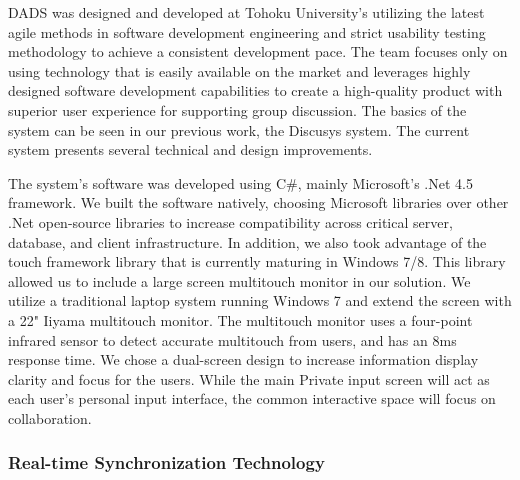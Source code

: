 \documentclass{sigchi}
\begin{document}
DADS was designed and developed at Tohoku University's  utilizing the latest agile methods in software development engineering and strict usability testing methodology to achieve a consistent development pace. The team focuses only on using technology that is easily available on the market and leverages highly designed software development capabilities to create a high-quality product with superior user experience for supporting group discussion. The basics of the system can be seen in our previous work, the Discusys system\cite{widjaja2013discusys}. The current system presents several technical and design improvements.


The system's software was developed using C\#, mainly Microsoft's .Net 4.5  framework. We built the software natively, choosing Microsoft libraries over other .Net open-source libraries to increase compatibility across critical server, database, and client infrastructure. In addition, we also took advantage of the touch framework library that is currently maturing in Windows 7/8. This library allowed us to include a large screen multitouch monitor in our solution. We utilize a traditional laptop system running Windows 7 and extend the screen with a 22" Iiyama multitouch monitor. The multitouch monitor uses a four-point infrared sensor to detect accurate multitouch from users, and has an 8ms response time. We chose a dual-screen design to increase information display clarity and focus for the users. While the main Private input screen will act as each user's personal input interface,  the common interactive space  will focus on collaboration. 

\subsubsection{Real-time Synchronization Technology}
\end{document}
